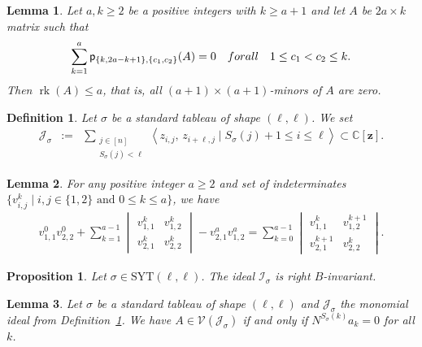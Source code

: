 \documentclass[10pt,a4paper]{amsart}
\newtheorem{lemma}{Lemma}
\newtheorem{definition}{Definition}
\newtheorem{prop}{Proposition}
\newcommand{\C}{\mathbb{C}}           %
\newcommand{\SYT}{\mathrm{SYT}}
\newcommand{\ci}{\mathcal{I}}
\newcommand{\cj}{\mathcal{J}}
\newcommand{\cv}{\mathcal{V}}
\newcommand{\gs}{\sigma}
\newcommand{\pl}{\mathsf{p}}
\newcommand{\rk}{\operatorname{rk}}
\begin{document}
\begin{lemma}\label{lem.rankcond} Let $a,k\geq 2$ be a positive integers with $k\geq a+1$ and let $A$ be $2a\times k$ matrix such that 
\begin{equation}\label{vanmins}
\sum_{k=1}^a \pl_{\{k,2a-k+1\},\{c_1,c_2\}}(A)=0 \quad \textup{ for all } \quad 1\leq c_1<c_2\leq k.
\end{equation}
Then $\rk(A)\leq a$, that is, all $(a+1)\times(a+1)$-minors of $A$ are zero.
\end{lemma}

\begin{definition}\label{def:JSigma} Let $\gs$ be a standard tableau of shape $(\ell, \ell)$. We set
\begin{eqnarray*}
\cj_\gs &:=& \sum_{\substack{j\in [n]\\ S_\sigma(j)<\ell}}\left< z_{i,j}, \, z_{i+\ell, j} \mid S_\gs(j)+1\leq i \leq \ell \right> \subset \C[\mathbf{z}].
\end{eqnarray*}
\end{definition}

\begin{lemma}\label{pairingdeterminants} For any positive integer $a\geq 2$ and set of indeterminates $\{v_{i,j}^k \mid i,j\in \{1,2\} \text{ and } 0\leq k \leq a \}$, we have
\begin{eqnarray}\label{lem:ident1}
v_{1,1}^0v_{2,2}^0+\displaystyle\sum_{k=1}^{a-1}\begin{vmatrix} v_{1,1}^k&v_{1,2}^k\\v_{2,1}^k&v_{2,2}^k\end{vmatrix}-v_{2,1}^av_{1,2}^a
=\sum_{k=0}^{a-1}\begin{vmatrix}
v_{1,1}^k&v_{1,2}^{k+1}\\
v_{2,1}^{k+1}&v_{2,2}^k
\end{vmatrix}.
\end{eqnarray}
\end{lemma}

\begin{prop}\label{binv} Let $\gs\in \SYT(\ell, \ell)$. The ideal $\ci_\gs$ is right $B$-invariant. 
\end{prop}

\begin{lemma}\label{lem.kernel} Let $\gs$ be a standard tableau of shape $(\ell,\ell)$ and $\cj_\gs$ the monomial ideal from Definition~\ref{def:JSigma}. We have $A\in \cv(\cj_\gs)$ if and only if $N^{S_\gs(k)} a_k =0$ for all $k$.
\end{lemma}
\end{document}
